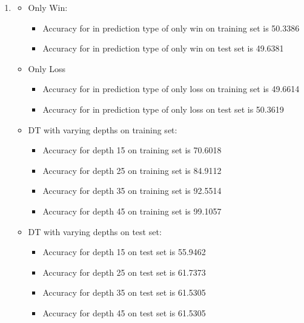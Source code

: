 \begin{enumerate}[label=(\alph*)]
    \begin{enumerate}[label=\roman*.]
        \item 
            \begin{itemize}
                \item Only Win:
                \begin{itemize}
                    \item Accuracy for in prediction type of only win on training set is 50.3386
                    \item Accuracy for in prediction type of only win on test set is 49.6381
                \end{itemize}
                \item Only Loss
                \begin{itemize}
                    \item Accuracy for in prediction type of only loss on training set is 49.6614
                    \item Accuracy for in prediction type of only loss on test set is 50.3619
                \end{itemize}
                \item DT with varying depths on training set:
                \begin{itemize}
                    \item Accuracy for depth 15 on training set is 70.6018
                    \item Accuracy for depth 25 on training set is 84.9112
                    \item Accuracy for depth 35 on training set is 92.5514
                    \item Accuracy for depth 45 on training set is 99.1057
                \end{itemize}
                \item DT with varying depths on test set:
                \begin{itemize}
                    \item Accuracy for depth 15 on test set is 55.9462
                    \item Accuracy for depth 25 on test set is 61.7373
                    \item Accuracy for depth 35 on test set is 61.5305
                    \item Accuracy for depth 45 on test set is 61.5305
                \end{itemize}
            \end{itemize}

\end{enumerate}
\end{enumerate}
